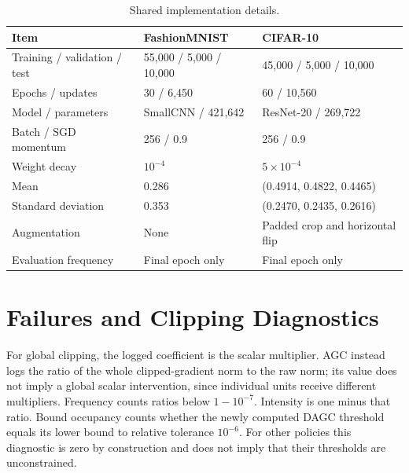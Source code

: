 \documentclass{article}
\begin{document}
\begin{table}[htbp]
\centering\small
\caption{Shared implementation details.}
\begin{tabular}{lll}
\toprule
Item & FashionMNIST & CIFAR-10\\
\midrule
Training / validation / test & 55,000 / 5,000 / 10,000 & 45,000 / 5,000 / 10,000\\
Epochs / updates & 30 / 6,450 & 60 / 10,560\\
Model / parameters & SmallCNN / 421,642 & ResNet-20 / 269,722\\
Batch / SGD momentum & 256 / 0.9 & 256 / 0.9\\
Weight decay & $10^{-4}$ & $5\times10^{-4}$\\
Mean & 0.286 & (0.4914, 0.4822, 0.4465)\\
Standard deviation & 0.353 & (0.2470, 0.2435, 0.2616)\\
Augmentation & None & Padded crop and horizontal flip\\
Evaluation frequency & Final epoch only & Final epoch only\\
\bottomrule
\end{tabular}
\end{table}

%
\begin{table}[htbp]
\centering\small
\caption{Complete calibration grid. Each candidate uses the same three seeds.
Entries list candidate: mean validation accuracy (percent). The final column
is selected before confirmation.}
\label{tab:calibration}

\end{table}


%
\clearpage
\section{Failures and Clipping Diagnostics}
For global clipping, the logged coefficient is the scalar multiplier. AGC
instead logs the ratio of the whole clipped-gradient norm to the raw norm;
its value does not imply a global scalar intervention, since individual units
receive different multipliers. Frequency counts ratios below $1-10^{-7}$.
Intensity is one minus that ratio. Bound occupancy counts whether the newly
computed DAGC threshold equals its lower bound to relative tolerance $10^{-6}$.
For other policies this diagnostic is zero by construction and does not imply
that their thresholds are unconstrained.
\begin{table}[htbp]
\centering\small
\caption{Failures and mean diagnostics across twelve seeds. $f$ is clipping
frequency, $I$ is intensity, and $b$ is lower-bound occupancy.}

\end{table}
\end{document}
